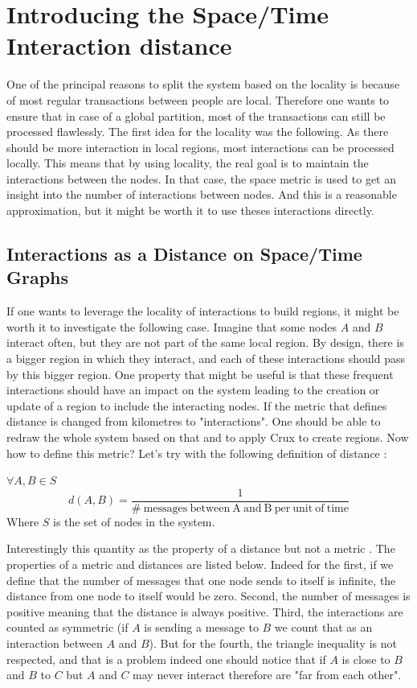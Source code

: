 \documentclass[a4paper,11pt,oneside]{report}
\begin{document}
\section{Introducing the Space/Time Interaction distance}
One of the principal reasons to split the system based on the locality is
because of most regular transactions between people are local. Therefore one
wants to ensure that in case of a global partition, most of the transactions
can still be processed flawlessly. The first idea for the locality was the
following. As there should be more interaction in local regions, most
interactions can be processed locally. This means that by using locality, the
real goal is to maintain the interactions between the nodes. In that case,
the space metric is used to get an insight into the number of interactions
between nodes. And this is a reasonable approximation, but it might be worth it
to use theses interactions directly. 

\subsection{Interactions as a Distance on Space/Time Graphs}

If one wants to leverage the locality of interactions to build regions, it
might be worth it to investigate the following case. Imagine that some nodes
$A$ and $B$ interact often, but they are not part of the same local
region. By design, there is a bigger region in which they interact, and each of
these interactions should pass by this bigger region. One property that might
be useful is that these frequent interactions should have an impact on the
system leading to the creation or update of a region to include the interacting nodes. If the
metric that defines distance is changed from kilometres to "interactions". One
should be able to redraw the whole system based on that and to apply Crux to
create regions. Now how to define this metric? Let's try with the
following definition of distance :


$\forall A, B \in S$
\begin{equation} \label{definition-distance}
 d(A,B) = \frac{1}{ \mathrm{\#\ messages\ between\ A\ and\ B\ per\ unit\ of\ time} } 
\end{equation}
Where $S$ is the set of nodes in the system.

Interestingly this quantity as the property of a distance but not a metric
\cite{Greenhoe2016}. The properties of a metric and distances are listed below.
Indeed for the first, if we define that the number of messages that one node
sends to itself is infinite, the distance from one node to itself would be
zero. Second, the number of messages is positive meaning that the distance is always positive. Third, the interactions are counted as symmetric (if $A$ is
sending a message to $B$ we count that as an interaction between $A$ and $B$).
But for the fourth, the triangle inequality is not respected, and that is a
problem indeed one should notice that if $A$ is close to $B$ and $B$ to $C$ but
$A$ and $C$ may never interact therefore are "far from each other".  
\end{document}
